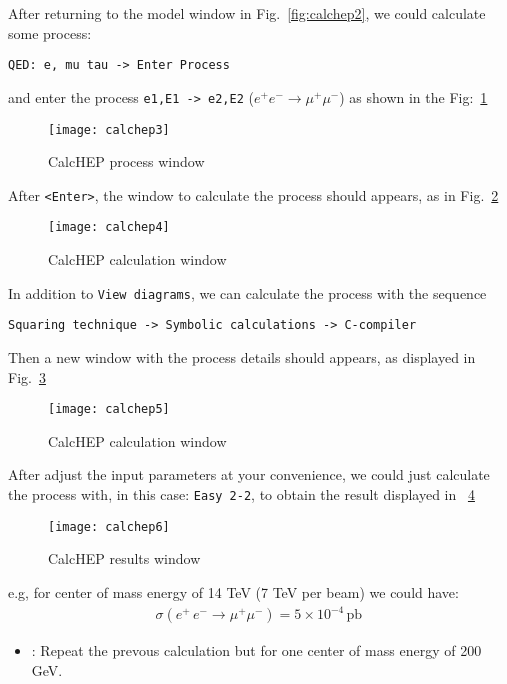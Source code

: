 \begin{frame}{}
After returning to the model window in Fig.~\ref{fig:calchep2}, we could calculate some process:
\begin{lstlisting}
QED: e, mu tau -> Enter Process 
\end{lstlisting}
and enter the process \lstinline{e1,E1 -> e2,E2} ($e^+ e^-\to \mu^+\mu^-$) as shown in the Fig:~\ref{fig:calchep3}
\begin{figure}
  \centering
  \texttt{[image: calchep3]}
  \caption{CalcHEP process window}
  \label{fig:calchep3}
\end{figure}
After \lstinline{<Enter>}, the window to calculate the process should appears, as in Fig.~\ref{fig:calchep4}
\begin{figure}
  \centering
  \texttt{[image: calchep4]}
  \caption{CalcHEP calculation window}
  \label{fig:calchep4}
\end{figure}
In addition to \lstinline{View diagrams}, we can calculate the process with the sequence
\begin{lstlisting}
Squaring technique -> Symbolic calculations -> C-compiler
\end{lstlisting}
Then a new window with the process details should appears, as displayed in Fig.~\ref{fig:calchep5}
\begin{figure}
  \centering
  \texttt{[image: calchep5]}
  \caption{CalcHEP calculation window}
  \label{fig:calchep5}
\end{figure}
After adjust the input parameters at your convenience, we could just calculate the process with, in this case: \lstinline{Easy 2-2}, to obtain the result displayed in ~\ref{fig:calchep6}
\begin{figure}
  \centering
  \texttt{[image: calchep6]}
  \caption{CalcHEP results window}
  \label{fig:calchep6}
\end{figure}
e.g, for center of mass energy of 14 TeV (7 TeV per beam) we could have:
\begin{align}
  \sigma(e^+\,e^-\to \mu^+\mu^-)=5\times 10^{-4}\,\text{pb}\,
\end{align}
\begin{itemize}
\item {}:
Repeat the prevous calculation but for one center of mass energy of 200 GeV.
\end{itemize}






\end{frame}
